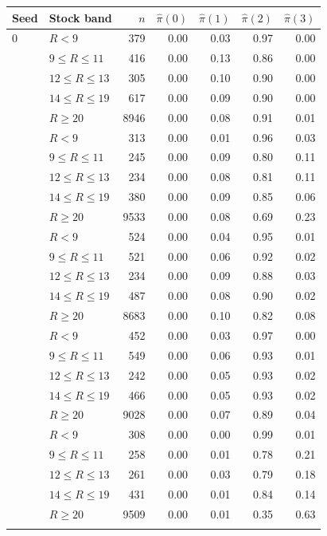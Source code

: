 \begin{tabular}{llrrrrr}
\toprule
Seed & Stock band & $n$ & $\hat\pi(0)$ & $\hat\pi(1)$ & $\hat\pi(2)$ & $\hat\pi(3)$ \\
\midrule
0 & $R<9$ & 379 & 0.00 & 0.03 & 0.97 & 0.00 \\
 & $9\le R\le 11$ & 416 & 0.00 & 0.13 & 0.86 & 0.00 \\
 & $12\le R\le 13$ & 305 & 0.00 & 0.10 & 0.90 & 0.00 \\
 & $14\le R\le 19$ & 617 & 0.00 & 0.09 & 0.90 & 0.00 \\
 & $R\ge 20$ & 8946 & 0.00 & 0.08 & 0.91 & 0.01 \\
\addlinespace
1 & $R<9$ & 313 & 0.00 & 0.01 & 0.96 & 0.03 \\
 & $9\le R\le 11$ & 245 & 0.00 & 0.09 & 0.80 & 0.11 \\
 & $12\le R\le 13$ & 234 & 0.00 & 0.08 & 0.81 & 0.11 \\
 & $14\le R\le 19$ & 380 & 0.00 & 0.09 & 0.85 & 0.06 \\
 & $R\ge 20$ & 9533 & 0.00 & 0.08 & 0.69 & 0.23 \\
\addlinespace
2 & $R<9$ & 524 & 0.00 & 0.04 & 0.95 & 0.01 \\
 & $9\le R\le 11$ & 521 & 0.00 & 0.06 & 0.92 & 0.02 \\
 & $12\le R\le 13$ & 234 & 0.00 & 0.09 & 0.88 & 0.03 \\
 & $14\le R\le 19$ & 487 & 0.00 & 0.08 & 0.90 & 0.02 \\
 & $R\ge 20$ & 8683 & 0.00 & 0.10 & 0.82 & 0.08 \\
\addlinespace
3 & $R<9$ & 452 & 0.00 & 0.03 & 0.97 & 0.00 \\
 & $9\le R\le 11$ & 549 & 0.00 & 0.06 & 0.93 & 0.01 \\
 & $12\le R\le 13$ & 242 & 0.00 & 0.05 & 0.93 & 0.02 \\
 & $14\le R\le 19$ & 466 & 0.00 & 0.05 & 0.93 & 0.02 \\
 & $R\ge 20$ & 9028 & 0.00 & 0.07 & 0.89 & 0.04 \\
\addlinespace
4 & $R<9$ & 308 & 0.00 & 0.00 & 0.99 & 0.01 \\
 & $9\le R\le 11$ & 258 & 0.00 & 0.01 & 0.78 & 0.21 \\
 & $12\le R\le 13$ & 261 & 0.00 & 0.03 & 0.79 & 0.18 \\
 & $14\le R\le 19$ & 431 & 0.00 & 0.01 & 0.84 & 0.14 \\
 & $R\ge 20$ & 9509 & 0.00 & 0.01 & 0.35 & 0.63 \\
\addlinespace
\bottomrule
\end{tabular}
